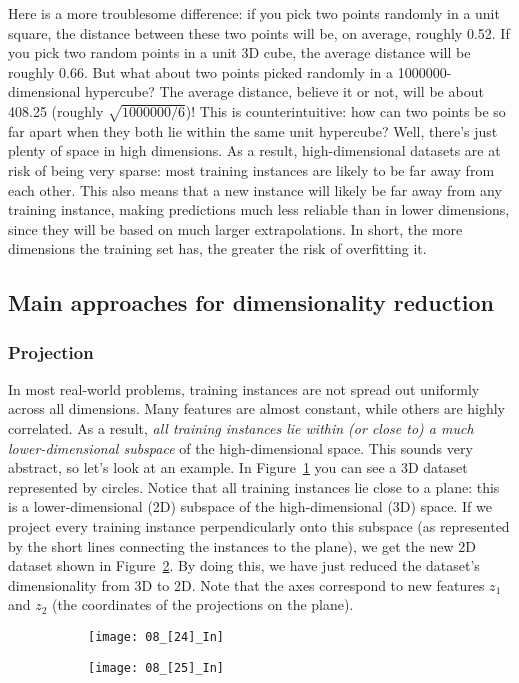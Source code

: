 Here is a more troublesome difference: if you pick two points randomly in a unit square, the distance between these two points will be, on average, roughly 0.52. If you pick two random points in a unit 3D cube, the average distance will be roughly 0.66. But what about two points picked randomly in a \num{1000000}-dimensional hypercube? The average distance, believe it or not, will be about \num{408.25} (roughly $\sqrt{\num{1000000}/6}$)! This is counterintuitive: how can two points be so far apart when they both lie within the same unit hypercube? Well, there's just plenty of space in high dimensions. As a result, high-dimensional datasets are at risk of being very sparse: most training instances are likely to be far away from each other. This also means that a new instance will likely be far away from any training instance, making predictions much less reliable than in lower dimensions, since they will be based on much larger extrapolations. In short, the more dimensions the training set has, the greater the risk of overfitting it.
\subsection{Main approaches for dimensionality reduction}
\subsubsection{Projection}
In most real-world problems, training instances are not spread out uniformly across all dimensions. Many features are almost constant, while others are highly correlated. As a result, \emph{all training instances lie within (or close to) a much lower-dimensional subspace} of the high-dimensional space. This sounds very abstract, so let's look at an example. In Figure~\ref{08_[24]_In} you can see a 3D dataset represented by circles. Notice that all training instances lie close to a plane: this is a lower-dimensional (2D) subspace of the high-dimensional (3D) space. If we project every training instance perpendicularly onto this subspace (as represented by the short lines connecting the instances to the plane), we get the new 2D dataset shown in Figure~\ref{08_[25]_In}. By doing this, we have just reduced the dataset's dimensionality from 3D to 2D. Note that the axes correspond to new features $z_1$ and $z_2$ (the coordinates of the projections on the plane).
\begin{figure}[h!t]
\centering
\begin{subfigure}[ht]{0.495\textwidth}
	\centering
	\texttt{[image: 08\_[24]\_In]}
	\caption{}\label{08_[24]_In}
\end{subfigure}
\hfill
\begin{subfigure}[ht]{0.475\textwidth}
	\centering
	\texttt{[image: 08\_[25]\_In]}
        \caption{}\label{08_[25]_In}
\end{subfigure}
\caption{}\label{08_[24-25]_In}
\end{figure}

